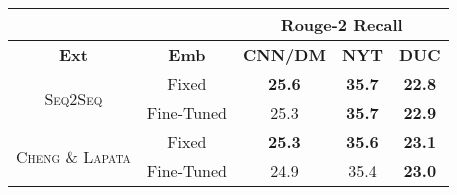 \begin{tabular}{ccccc}
      & & \multicolumn{3}{c}{\textbf{Rouge-2 Recall}}\\
      \toprule
        \textbf{Ext} & \textbf{Emb}  & 
           \textbf{CNN/DM} & 
           \textbf{NYT} & 
           \textbf{DUC} \\
      \midrule
      \multirow{2}{*}{\textsc{Seq2Seq}} 
        & Fixed & \textbf{25.6} & \textbf{35.7} & \textbf{22.8} \\
        & Fine-Tuned &         25.3  & \textbf{35.7} & \textbf{22.9} \\
      \hline
      \multirow{2}{*}{\textsc{Cheng \& Lapata}} 
        & Fixed & \textbf{25.3} & \textbf{35.6} & \textbf{23.1} \\
        & Fine-Tuned &         24.9  &         35.4  & \textbf{23.0} \\
      \bottomrule
  \end{tabular}

